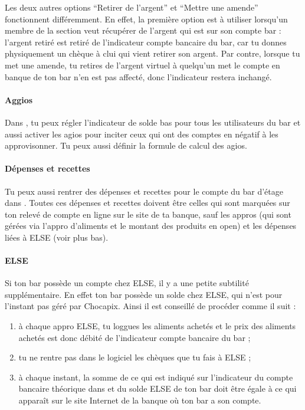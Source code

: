 \documentclass[12pt,french]{article}
\begin{document}
Les deux autres options \enquote{Retirer de l'argent} et \enquote{Mettre une amende} fonctionnent différemment. En effet, la première option est à utiliser lorsqu'un membre de la section veut récupérer de l'argent qui est sur son compte bar : l'argent retiré est retiré de l'indicateur compte bancaire du bar, car tu donnes physiquement un chèque à clui qui vient retirer son argent. Par contre, lorsque tu met une amende, tu retires de l'argent virtuel à quelqu'un met le compte en banque de ton bar n'en est pas affecté, donc l'indicateur restera inchangé.

\paragraph{Aggios} Dans , tu peux régler l'indicateur de solde bas pour tous les utilisateurs du bar et aussi activer les agios pour inciter ceux qui ont des comptes en négatif à les approvisonner. Tu peux aussi définir la formule de calcul des agios.

\paragraph{Dépenses et recettes} Tu peux aussi rentrer des dépenses et recettes pour le compte du bar d'étage dans .%
Toutes ces dépenses et recettes doivent être celles qui sont marquées sur ton relevé de compte en ligne sur le site de ta banque, sauf les appros (qui sont gérées via l'appro d'aliments et le montant des produits en open) et les dépenses liées à ELSE (voir plus bas).

\paragraph{ELSE} Si ton bar possède un compte chez ELSE, il y a une petite subtilité supplémentaire. En effet ton bar possède un solde chez ELSE, qui n'est pour l'instant pas géré par Chocapix. Ainsi il est conseillé de procéder comme il suit :
\begin{enumerate}
	\item à chaque appro ELSE, tu loggues les aliments achetés et le prix des aliments achetés est donc débité de l'indicateur compte bancaire du bar ;
	\item tu ne rentre pas dans le logiciel les chèques que tu fais à ELSE ;
	\item à chaque instant, la somme de ce qui est indiqué sur l'indicateur du compte bancaire théorique dans  et du solde ELSE de ton bar doit être égale à ce qui apparaît sur le site Internet de la banque où ton bar a son compte.
\end{enumerate}
\end{document}
